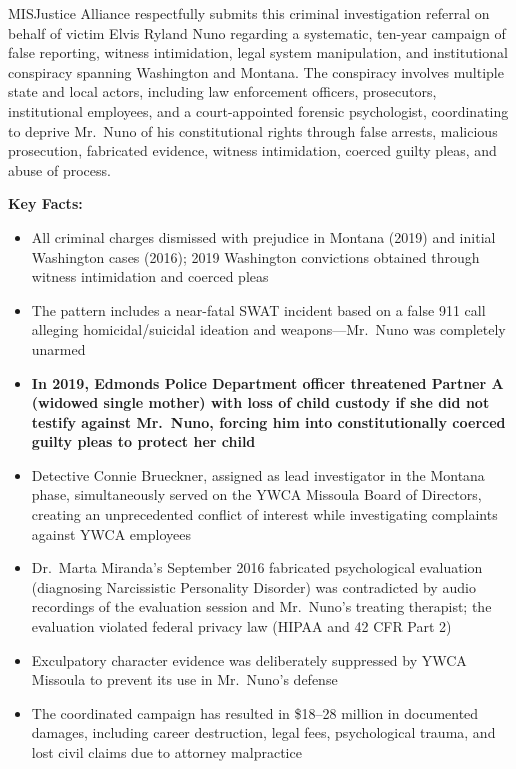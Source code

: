 \documentclass[11pt, letterpaper]{article}
\newcommand{\subsectiontitle}[1]{\vspace{0.15in}\noindent\textcolor{NavyBlue}{\textbf{#1}}\vspace{0.05in}}
\begin{document}
MISJustice Alliance respectfully submits this criminal investigation referral on behalf of victim Elvis Ryland Nuno regarding a systematic, ten-year campaign of false reporting, witness intimidation, legal system manipulation, and institutional conspiracy spanning Washington and Montana. The conspiracy involves multiple state and local actors, including law enforcement officers, prosecutors, institutional employees, and a court-appointed forensic psychologist, coordinating to deprive Mr.\ Nuno of his constitutional rights through false arrests, malicious prosecution, fabricated evidence, witness intimidation, coerced guilty pleas, and abuse of process.

\subsectiontitle{Key Facts:}
\begin{itemize}[leftmargin=*,itemsep=3pt]
    \item All criminal charges dismissed with prejudice in Montana (2019) and initial Washington cases (2016); 2019 Washington convictions obtained through witness intimidation and coerced pleas
    \item The pattern includes a near-fatal SWAT incident based on a false 911 call alleging homicidal/suicidal ideation and weapons---Mr.\ Nuno was completely unarmed
    \item \textbf{In 2019, Edmonds Police Department officer threatened Partner A (widowed single mother) with loss of child custody if she did not testify against Mr.\ Nuno, forcing him into constitutionally coerced guilty pleas to protect her child}
    \item Detective Connie Brueckner, assigned as lead investigator in the Montana phase, simultaneously served on the YWCA Missoula Board of Directors, creating an unprecedented conflict of interest while investigating complaints against YWCA employees
    \item Dr.\ Marta Miranda's September 2016 fabricated psychological evaluation (diagnosing Narcissistic Personality Disorder) was contradicted by audio recordings of the evaluation session and Mr.\ Nuno's treating therapist; the evaluation violated federal privacy law (HIPAA and 42 CFR Part 2)
    \item Exculpatory character evidence was deliberately suppressed by YWCA Missoula to prevent its use in Mr.\ Nuno's defense
    \item The coordinated campaign has resulted in \$18--28 million in documented damages, including career destruction, legal fees, psychological trauma, and lost civil claims due to attorney malpractice
\end{itemize}
\end{document}
